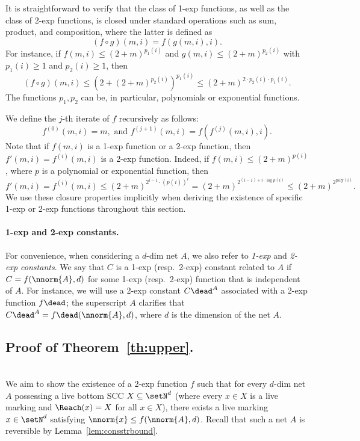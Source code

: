 It is straightforward to verify that the class of 1-exp functions, as
well as  the class of 2-exp functions, 
 is
closed under standard operations such as sum, product, and
composition, where the latter is
defined as \[(f\circ g)(m,i)=f(g(m,i),i).\]
For instance, if $f(m,i)\leq	(2+m)^{{p_1(i)}}$
and 
 $g(m,i)\leq	(2+m)^{{p_2(i)}}$ with $p_1(i)\geq 1$ and
 $p_2(i)\geq 1$, then  
\[(f\circ g)(m,i)\leq
\left(2+(2+m)^{{p_2(i)}}\right)^{{p_1(i)}}\leq 
(2+m)^{{2\cdot p_2(i)\cdot p_1(i)}}.\]
The functions $p_1, p_2$
can be, in particular, polynomials or exponential functions.

 We define the $j$-th iterate of $f$ recursively
as follows:
\begin{equation*}
	f^{(0)}(m,i)=m,\text{ and }
f^{(j+1)}(m,i) = f(f^{(j)}(m,i), i).
\end{equation*}
Note that 
if $f(m,i)$ is a 1-exp function or a 2-exp function, then $f'(m,i)=f^{(i)}(m,i)$ 
is a 2-exp function. Indeed,
if $f(m,i)\leq (2+m)^{{p(i)}}$, where $p$ is a polynomial or
exponential function, then
\[f'(m,i)=f^{(i)}(m,i)\leq (2+m)^{2^{i-1}\cdot
(p(i))^i}=(2+m)^{2^{(i-1)+ i\cdot \log
p(i)}}\leq(2+m)^{2^{\text{poly}(i)}}.\]
We use these closure properties
implicitly when deriving the existence of specific 1-exp or 2-exp functions 
throughout this section.

\paragraph{1-exp and 2-exp constants.}

For convenience, when considering a $d$-dim net $A$, we also
refer to \emph{1-exp} and \emph{2-exp constants}. We say that $C$ is a 1-exp (resp.~2-exp)
constant related to $A$ if
$C=f(\nnorm{A},d)$ for some 1-exp (resp.~2-exp) function that is independent of $A$.
For instance, we will use a 2-exp constant $C\dead^A$ associated
with a 2-exp function $f\dead$; the superscript $A$ clarifies that 
$C\dead^A=f\dead(\nnorm{A},d)$, where $d$ is the dimension of the net $A$.

\subsection{Proof of
Theorem~\ref{th:upper}.}\label{sec:infproof}
\hfill\\

We aim to show the existence of a 2-exp function $f$ such that for every $d$-dim
net $A$ possessing a live bottom SCC $X\subseteq\setN^d$ (where every
$x\in X$ is a live marking and $\Reach(x)=X$ for all
$x\in X$),
 there exists a live marking
$x\in\setN^d$ satisfying $\nnorm{x}\leq f(\nnorm{A},d)$.
 Recall that 
such a net $A$ is reversible by Lemma~\ref{lem:consstrbound}.

